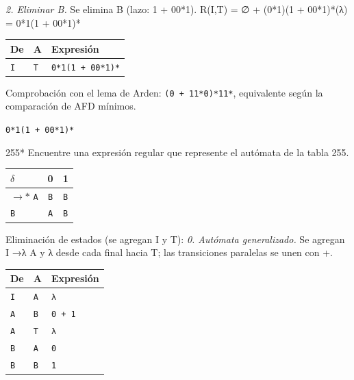 \documentclass[11pt]{article}
\begin{document}
\textit{2. Eliminar B.} Se elimina B (lazo: 1 + 00*1). R(I,T) = ∅ + (0*1)(1 + 00*1)*(λ) = 0*1(1 + 00*1)*
\begin{center}\footnotesize\begin{tabular}{lll}\toprule
De & A & Expresión \\\midrule
\texttt{I} & \texttt{T} & \texttt{0*1(1 + 00*1)*} \\
\bottomrule\end{tabular}\end{center}
Comprobación con el lema de Arden: \texttt{(0 + 11*0)*11*}, equivalente según la comparación de AFD mínimos.

\resp \texttt{0*1(1 + 00*1)*}


\begin{ejercicio}{255}{*}
Encuentre una expresión regular que represente el autómata de la tabla 255.
\end{ejercicio}
\proc \begin{center}\small\begin{tabular}{lcc}\toprule
$\delta$ & 0 & 1 \\\midrule
$\to$$*$ \texttt{A} & \texttt{B} & \texttt{B} \\
 \texttt{B} & \texttt{A} & \texttt{B} \\
\bottomrule\end{tabular}\end{center}
Eliminación de estados (se agregan I y T):
\textit{0. Autómata generalizado.} Se agregan I →λ A y λ desde cada final hacia T; las transiciones paralelas se unen con +.
\begin{center}\footnotesize\begin{tabular}{lll}\toprule
De & A & Expresión \\\midrule
\texttt{I} & \texttt{A} & \texttt{λ} \\
\texttt{A} & \texttt{B} & \texttt{0 + 1} \\
\texttt{A} & \texttt{T} & \texttt{λ} \\
\texttt{B} & \texttt{A} & \texttt{0} \\
\texttt{B} & \texttt{B} & \texttt{1} \\
\bottomrule\end{tabular}\end{center}
\end{document}
